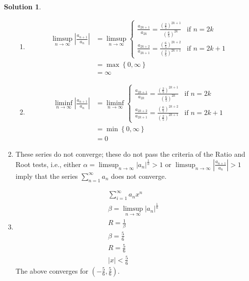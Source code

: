\documentclass[12pt]{article}
\theoremstyle{definition} %
\newtheorem{solution}{Solution}
\theoremstyle{plain} %
\begin{document}
\begin{solution}
\begin{enumerate}
\begin{enumerate}
              \item 
              \begin{align}
                 \limsup_{n \to \infty} \left| \frac{a_{n+1}}{a_n} \right| &= \limsup_{n \to \infty} 
                 \begin{cases}
                     \frac{a_{2k+1}}{a_{2k}} = \frac{\left(\frac{2}{5}\right)^{2k+1}}{\left(\frac{6}{5}\right)^{2k}} & \text{if } n = 2k \\
                     \frac{a_{2k+2}}{a_{2k+1}} = \frac{\left(\frac{6}{5}\right)^{2k+2}}{\left(\frac{2}{5}\right)^{2k+1}} & \text{if } n = 2k+1
                 \end{cases} \\[10pt]
                 &= \max \left\{ 0, \infty \right\} \\[10pt]
                 &= \infty
    \end{align}
    \item 
    \begin{align}
       \liminf_{n \to \infty} \left| \frac{a_{n+1}}{a_n} \right| &= \liminf_{n \to \infty} 
       \begin{cases}
           \frac{a_{2k+1}}{a_{2k}} = \frac{\left(\frac{2}{5}\right)^{2k+1}}{\left(\frac{6}{5}\right)^{2k}} & \text{if } n = 2k \\[10pt]
           \frac{a_{2k+2}}{a_{2k+1}} = \frac{\left(\frac{6}{5}\right)^{2k+2}}{\left(\frac{2}{5}\right)^{2k+1}} & \text{if } n = 2k+1
       \end{cases} \\[10pt]
       &= \min \left\{ 0, \infty \right\} \\[10pt]
       &= 0
    \end{align}
\end{enumerate}
\item These series do not converge; these do not pass the criteria of the Ratio and Root tests, i.e., either \(\alpha = \limsup_{n \to \infty} \left\vert a_{n} \right\vert^{\frac{1}{n}}>1 \) or \(\limsup_{n \to \infty} \left\vert \frac{a_{n+1}}{a_{n}}  \right\vert>1 \) imply that the series \(\sum_{n=1}^{\infty} a_{n}\) does not converge.
\item 
\begin{align}    
\sum_{i=1}^{\infty} a_{n}x^{n} \\[10pt] 
\beta = \limsup_{n \to \infty} \left\vert a_{n} \right\vert^{\frac{1}{n}} \\[10pt] 
R = \frac{1}{\beta}\\[10pt] 
\beta = \frac{5}{6} \\[10pt] 
R = \frac{5}{6} \\[10pt] 
\left\vert x \right\vert < \frac{5}{6}
\end{align}
The above converges for \((-\frac{5}{6}, \frac{5}{6})\). 
   \end{enumerate} 
\end{solution}
\end{document}
